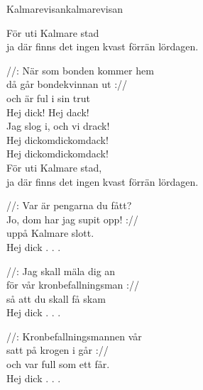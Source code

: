\begin{song}{Kalmarevisan}{kalmarevisan}
\begin{vers}
För uti Kalmare stad\\
ja där finns det ingen kvast förrän lördagen.\\
\end{vers}
\begin{vers}
//: När som bonden kommer hem\\
då går bondekvinnan ut ://\\
och är ful i sin trut\\
Hej dick! Hej dack!\\
Jag slog i, och vi drack!\\
Hej dickomdickomdack!\\
Hej dickomdickomdack!\\
För uti Kalmare stad,\\
ja där finns det ingen kvast förrän lördagen.\\
\end{vers}
\begin{vers}
//: Var är pengarna du fått?\\
Jo, dom har jag supit opp! ://\\
uppå Kalmare slott.\\
Hej dick . . .\\
\end{vers}
\begin{vers}
//: Jag skall mäla dig an\\
för vår kronbefallningsman ://\\
så att du skall få skam\\
Hej dick . . .\\
\end{vers}
\begin{vers}
//: Kronbefallningsmannen vår\\
satt på krogen i går ://\\
och var full som ett får.\\
Hej dick . . .\\
\end{vers}
\end{song}
